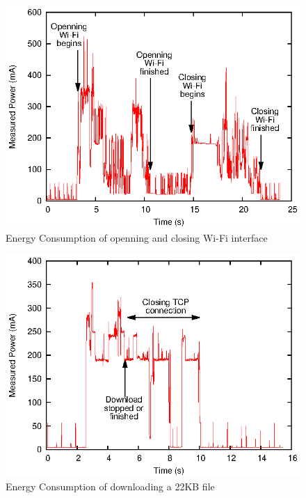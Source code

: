 \documentclass[journal]{IEEEtran}
\begin{document}
\begin{figure}
\centering
\includegraphics[scale=0.95]{energy_open_close_wifi.eps}
\caption{Energy Consumption of openning and closing Wi-Fi interface}
\end{figure}
\begin{figure}
\centering
\includegraphics[scale=0.95]{energy_Download_22KB.eps}
\caption{Energy Consumption of downloading a 22KB file}
\end{figure}
\end{document}
